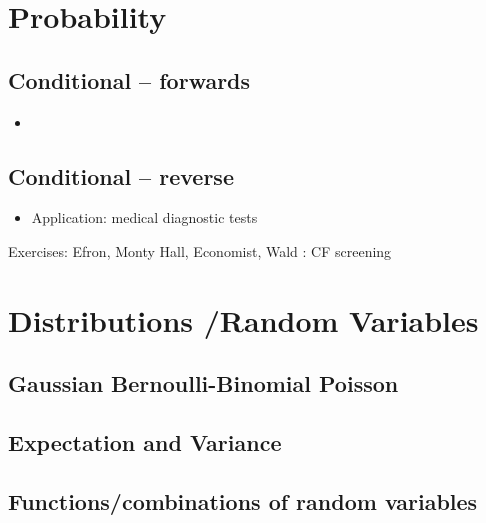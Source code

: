 \documentclass[]{book}
\providecommand{\tightlist}{%
  \setlength{\itemsep}{0pt}\setlength{\parskip}{0pt}}
\begin{document}
\hypertarget{Probability}{%
\chapter{Probability}\label{Probability}}

\hypertarget{conditional-forwards-1}{%
\section{Conditional -- forwards}\label{conditional-forwards-1}}

\begin{itemize}
\item
\end{itemize}

\hypertarget{conditional-reverse-1}{%
\section{Conditional -- reverse}\label{conditional-reverse-1}}

\begin{itemize}
\tightlist
\item
  Application: medical diagnostic tests
\end{itemize}

Exercises: Efron, Monty Hall, Economist,
Wald : CF screening

\hypertarget{Distributions}{%
\chapter{Distributions /Random Variables}\label{Distributions}}

\hypertarget{gaussian-bernoulli-binomial-poisson-1}{%
\section{Gaussian Bernoulli-Binomial Poisson}\label{gaussian-bernoulli-binomial-poisson-1}}

\hypertarget{expectation-and-variance-1}{%
\section{Expectation and Variance}\label{expectation-and-variance-1}}

\hypertarget{functionscombinations-of-random-variables-1}{%
\section{Functions/combinations of random variables}\label{functionscombinations-of-random-variables-1}}
\end{document}
